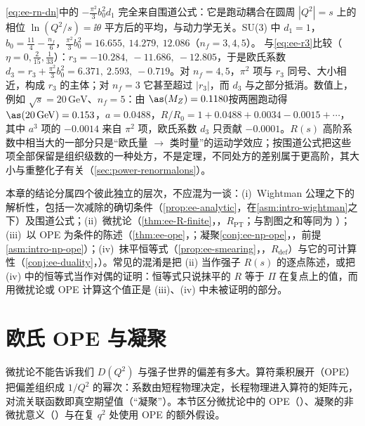 \begin{example}[$O(a^3)$ 的 $\pi^2$ 项]\label{ex:ee-pi2}
\cref{eq:ee-rn-dn}中的 $-\frac{\pi^2}3b_0^2d_1$ 完全来自围道公式：它是跑动耦合在圆周 $|Q^2|=s$ 上的相位 $\ln(Q^2/s)=\ii\theta$ 平方后的平均，与动力学无关。SU(3) 中 $d_1=1$，$b_0=\frac{11}4-\frac{n_f}6$，$\frac{\pi^2}3b_0^2=16.655,\ 14.279,\ 12.086$（$n_f=3,4,5$）。%
与\cref{eq:ee-r3}比较（$\eta=0,\frac2{15},\frac1{33}$）：$r_3=-10.284,\ -11.686,\ -12.805$，于是欧氏系数 $d_3=r_3+\frac{\pi^2}3b_0^2=6.371,\ 2.593,\ -0.719$。对 $n_f=4,5$，$\pi^2$ 项与 $r_3$ 同号、大小相近，构成 $r_3$ 的主体；对 $n_f=3$ 它甚至超过 $|r_3|$，而 $d_3$ 与之部分抵消。数值上，例如 $\sqrt s=20\,\mathrm{GeV}$、$n_f=5$：由 $\as(M_Z)=0.1180$\cite[式~(9.25)]{ParticleDataGroup:2024cfk}按两圈跑动得 $\as(20\,\mathrm{GeV})=0.153$，$a=0.0488$，$R/R_0=1+0.0488+0.0034-0.0015+\cdots$，其中 $a^3$ 项的 $-0.0014$ 来自 $\pi^2$ 项，欧氏系数 $d_3$ 只贡献 $-0.0001$。$R(s)$ 高阶系数中相当大的一部分只是“欧氏量 $\to$ 类时量”的运动学效应\cite{KrasnikovPivovarov1982,KataevStarshenko1995}；按围道公式把这些项全部保留是组织级数的一种处方，不是定理，不同处方的差别属于更高阶，其大小与重整化子有关（\cref{sec:power-renormalons}）。
\end{example}

\begin{remark}[四个逻辑层次]\label{rem:ee-status-layout}
本章的结论分属四个彼此独立的层次，不应混为一谈：(i)~Wightman 公理之下的解析性，包括一次减除的确切条件（\cref{prop:ee-analytic}，在\cref{asm:intro-wightman}之下）及围道公式；(ii)~微扰论（\cref{thm:ee-R-finite}，\tagR，$R_{\mathrm{PT}}$；与割图之和等同为 \tagA）；(iii)~以 OPE 为条件的陈述（\cref{thm:ee-ope}，\tagA；凝聚\cref{conj:ee-np-ope}，\tagC，前提\cref{asm:intro-np-ope}）；(iv)~抹平恒等式（\cref{prop:ee-smearing}，\tagR，$R_{\mathrm{def}}$）与它的可计算性（\cref{conj:ee-duality}，\tagC）。常见的混淆是把 (ii) 当作强子 $R(s)$ 的逐点陈述，或把 (iv) 中的恒等式当作对偶的证明：恒等式只说抹平的 $R$ 等于 $\Pi$ 在复点上的值，而用微扰论或 OPE 计算这个值正是 (iii)、(iv) 中未被证明的部分。
\end{remark}

\section{欧氏 OPE 与凝聚}\label{sec:ee-ope}

微扰论不能告诉我们 $D(Q^2)$ 与强子世界的偏差有多大。算符乘积展开（OPE）把偏差组织成 $1/Q^2$ 的幂次：系数由短程物理决定，长程物理进入算符的矩阵元，对流关联函数即真空期望值（“凝聚”）。本节区分微扰论中的 OPE（\tagA）、凝聚的非微扰意义（\tagC）与在复 $q^2$ 处使用 OPE 的额外假设。

